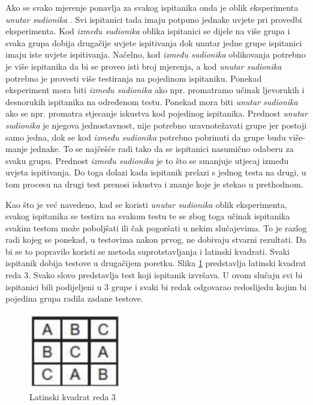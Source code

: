 \documentclass[times, utf8, zavrsni, numeric]{fer}
\begin{document}
Ako se svako mjerenje ponavlja za svakog ispitanika onda je oblik eksperimenta \emph{unutar sudionika} . Svi ispitanici tada imaju potpuno jednake uvjete pri provedbi eksperimenta. Kod \emph{između sudionika}  oblika ispitanici se dijele na više grupa i svaka grupa dobija drugačije uvjete ispitivanja dok unutar jedne grupe ispitanici imaju iste uvjete ispitivanja. Načelno, kod \emph{između sudionika} oblikovanja potrebno je više ispitanika da bi se proveo isti broj mjerenja, a kod \emph{unutar sudionika} potrebno je provesti više testiranja na pojedinom ispitaniku. Ponekad eksperiment mora biti \emph{između sudionika} ako npr. promatramo učinak ljevorukih i desnorukih ispitanika na određenom testu. Ponekad mora biti \emph{unutar sudionika} ako se npr. promatra stjecanje iskustva kod pojedinog ispitanika. Prednost \emph{unutar sudionika} je njegova jednostavnost, nije potrebno uravnotežavati grupe jer postoji samo jedna, dok se kod \emph{između sudionika} potrebno pobrinuti da grupe budu više-manje jednake. To se najčešće radi tako da se ispitanici nasumično odaberu za svaku grupu. Prednost \emph{između sudionika} je to što se smanjuje utjecaj između uvjeta ispitivanja. Do toga dolazi kada ispitanik prelazi s jednog testa na drugi, u tom procesu na drugi test prenosi iskustva i znanje koje je stekao u prethodnom.

Kao što je već navedeno, kad se koristi \emph{unutar sudionika} oblik eksperimenta, svakog ispitanika se testira na svakom testu te se zbog toga učinak ispitanika svakim testom može poboljšati ili čak pogoršati u nekim slučajevima. To je razlog radi kojeg se ponekad, u testovima nakon prvog, ne dobivaju stvarni rezultati. Da bi se to popravilo koristi se metoda suprotstavljanja i latinski kvadrati. Svaki ispitanik dobija testove u drugačijem poretku. Slika \ref{fig:latinski_kvadrat} predstavlja latinski kvadrat reda $3$. Svako slovo predstavlja test koji ispitanik izvršava. U ovom slučaju svi bi ispitanici bili podijeljeni u 3 grupe i svaki bi redak odgovarao redoslijedu kojim bi pojedina grupa radila zadane testove.

\begin{figure}[htb]
\centering
\includegraphics[width=4cm]{img/latinski_kvadrat.png}
\caption{Latinski kvadrat reda 3}
\label{fig:latinski_kvadrat}
\end{figure}
\end{document}
